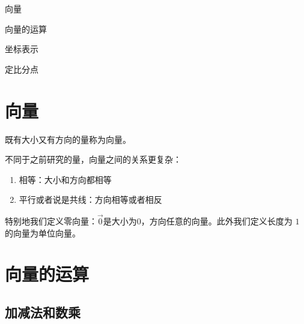 \begin{introduction}
    \item 向量
    \item 向量的运算
    \item 坐标表示
    \item 定比分点
\end{introduction}

\section{向量}

\begin{definition}[向量]
    既有大小又有方向的量称为向量。
\end{definition}

不同于之前研究的量，向量之间的关系更复杂：
\begin{enumerate}
    \item 相等：大小和方向都相等
    \item 平行或者说是共线：方向相等或者相反
\end{enumerate}

\begin{definition}[零向量与单位向量]
    特别地我们定义零向量：$\overrightarrow{0}$是大小为$0$，方向任意的向量。此外我们定义长度为 $1$ 的向量为单位向量。
\end{definition}

\section{向量的运算}

\subsection{加减法和数乘}


